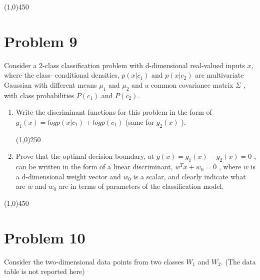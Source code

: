 \documentclass[12pt]{article}
\begin{document}
\begin{center}
\line(1,0){450}
\end{center}


\section{Problem 9}
Consider a 2-class classification problem with d-dimensional real-valued inputs $x$, where the class-
conditional densities, $p ( x | c_1 )$ and $p ( x | c_2 )$ are multivariate Gaussian with different means $\mu_1$ and $\mu_2$ and a common covariance matrix $\Sigma$ , with class probabilities $P(c_1 )$ and $P(c_2 )$.
\begin{enumerate}
\item Write the discriminant functions for this problem in the form of $g_1 ( x ) = log p ( x | c_1 ) + log p ( c_1 )$ (same for $g_2 ( x )$ ). \\


\begin{center}
\line(1,0){250}
\end{center}


\item Prove that the optimal decision boundary, at $g ( x ) = g_1 ( x ) - g_2 ( x ) = 0$ , can be written in the form of a linear discriminant, $w^Tx + w_0 = 0$ , where $w$ is a d-dimensional weight vector and $w_0$ is a scalar, and clearly indicate what are $w$ and $w_0$ are in terms of
parameters of the classification model.\\
\end{enumerate}


\begin{center}
\line(1,0){450}
\end{center}


\section{Problem 10}
Consider the two-dimensional data points from two classes $W_1$ and $W_2$. (The data table is not reported here)
\end{document}
